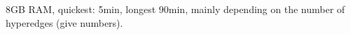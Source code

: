 8GB RAM, quickest: 5min, longest 90min, mainly depending on the number of hyperedges (give numbers).














